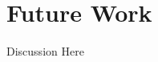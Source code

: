 \documentclass[]{elsarticle}
\theoremstyle{definition}
\theoremstyle{remark}
\begin{document}
%
%
%
%



\section{Future Work}
Discussion Here
\end{document}
